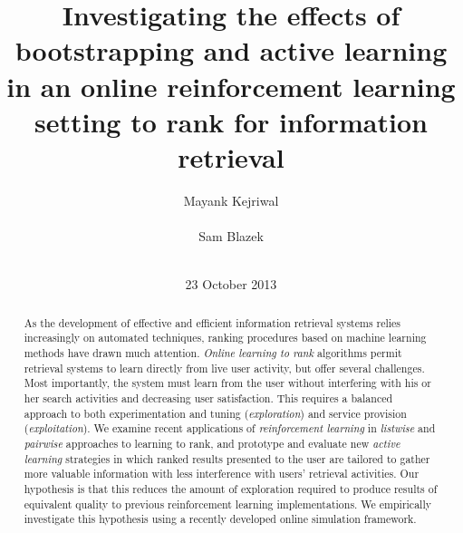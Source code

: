 \documentclass{acm_proc_article-sp}
\begin{document}
\title{Investigating the effects of bootstrapping and active learning in an online reinforcement learning setting to rank for information retrieval}


\author{
\alignauthor
Mayank Kejriwal\\
       \\
\alignauthor
Sam Blazek\\
       \\
}

\date{23 October 2013}


\maketitle
\begin{abstract}
As the development of effective and efficient information retrieval systems relies increasingly on automated techniques, ranking procedures based on machine learning methods have drawn much attention. \emph{Online learning to rank} algorithms permit retrieval systems to learn directly from live user activity, but offer several challenges. Most importantly, the system must learn from the user without interfering with his or her search activities and decreasing user satisfaction. This requires a balanced approach to both experimentation and tuning (\emph{exploration}) and service provision (\emph{exploitation}). We examine recent applications of \emph{reinforcement learning} in \emph{listwise} and \emph{pairwise} approaches to learning to rank, and prototype and evaluate new \emph{active learning} strategies in which ranked results presented to the user are tailored to gather more valuable information with less interference with users' retrieval activities. Our hypothesis is that this reduces the amount of exploration required to produce results of equivalent quality to previous reinforcement learning implementations. We empirically investigate this hypothesis using a recently developed online simulation framework.
\end{abstract}


\end{document}
